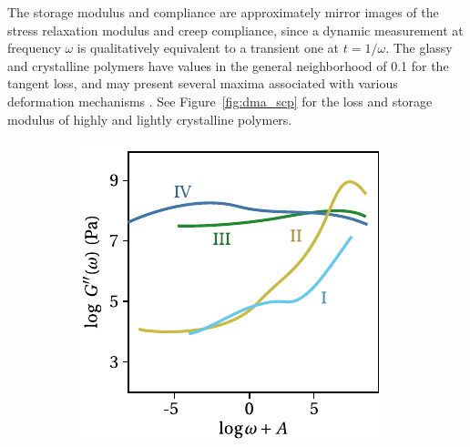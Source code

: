The storage modulus and compliance are approximately mirror images of the stress relaxation modulus and creep compliance, since a dynamic measurement at frequency $\omega$ is qualitatively equivalent to a transient one at $t=1/\omega$.
The glassy and crystalline polymers have values in the general neighborhood of 0.1 for the tangent loss, and may present several maxima associated with various deformation mechanisms \citep{ferryViscoelasticPropertiesPolymers1980}.
See Figure~\ref{fig:dma_scp} for the loss and storage modulus of highly and lightly crystalline polymers.
\begin{figure}
\centering
\begin{subfigure}[b]{0.45\textwidth}
		\centering
						\includegraphics[width=\textwidth]{figures/loss_modulus_scp}
						\caption{}
						\label{subfig:loss_modulus_scp}
		\end{subfigure} \hfill
		\begin{subfigure}[b]{0.45\textwidth}
						\centering

\end{subfigure}
\end{figure}
